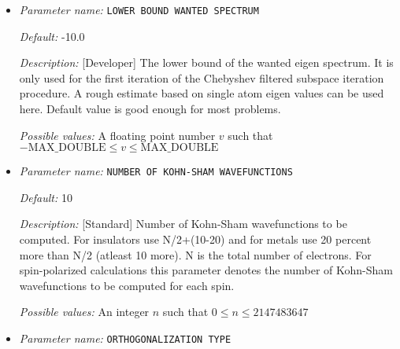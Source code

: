 \begin{itemize}


{\it Default:} 0


{\it Description:} [Developer] The value of the fraction of the upper bound of the unwanted spectrum, the lower bound of the unwanted spectrum will be set. Default value is 0.


{\it Possible values:} A floating point number $v$ such that $0 \leq v \leq 1$
\item {\it Parameter name:} {\tt LOWER BOUND WANTED SPECTRUM}
\label{parameters:SCF parameters/Eigen_2dsolver parameters/LOWER BOUND WANTED SPECTRUM}
\label{parameters:SCF_20parameters/Eigen_2dsolver_20parameters/LOWER_20BOUND_20WANTED_20SPECTRUM}




{\it Default:} -10.0


{\it Description:} [Developer] The lower bound of the wanted eigen spectrum. It is only used for the first iteration of the Chebyshev filtered subspace iteration procedure. A rough estimate based on single atom eigen values can be used here. Default value is good enough for most problems.


{\it Possible values:} A floating point number $v$ such that $-\text{MAX\_DOUBLE} \leq v \leq \text{MAX\_DOUBLE}$
\item {\it Parameter name:} {\tt NUMBER OF KOHN-SHAM WAVEFUNCTIONS}
\label{parameters:SCF parameters/Eigen_2dsolver parameters/NUMBER OF KOHN_2dSHAM WAVEFUNCTIONS}
\label{parameters:SCF_20parameters/Eigen_2dsolver_20parameters/NUMBER_20OF_20KOHN_2dSHAM_20WAVEFUNCTIONS}




{\it Default:} 10


{\it Description:} [Standard] Number of Kohn-Sham wavefunctions to be computed. For insulators use N/2+(10-20) and for metals use 20 percent more than N/2 (atleast 10 more). N is the total number of electrons. For spin-polarized calculations this parameter denotes the number of Kohn-Sham wavefunctions to be computed for each spin.


{\it Possible values:} An integer $n$ such that $0\leq n \leq 2147483647$
\item {\it Parameter name:} {\tt ORTHOGONALIZATION TYPE}
\label{parameters:SCF parameters/Eigen_2dsolver parameters/ORTHOGONALIZATION TYPE}
\label{parameters:SCF_20parameters/Eigen_2dsolver_20parameters/ORTHOGONALIZATION_20TYPE}



\end{itemize}
